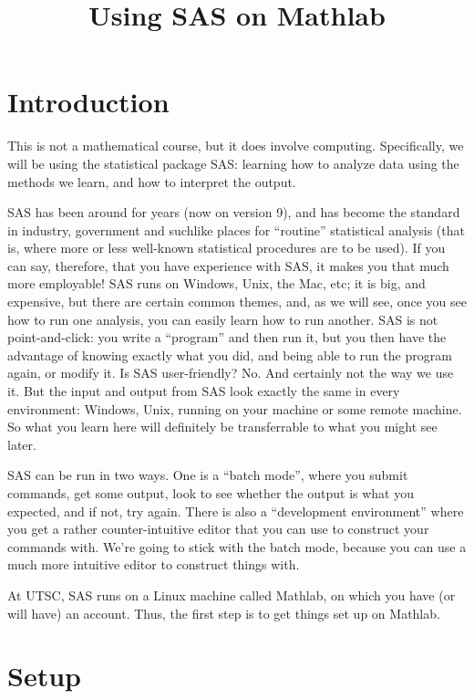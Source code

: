 \documentclass[11pt]{article}
\title{Using SAS on Mathlab}
\author{}
\date{}
\begin{document}
\maketitle

\section{Introduction}
\label{sec:intro}

This is not a mathematical course, but it does involve
computing. Specifically, we will be using the statistical package SAS:
learning how to analyze data using the methods we learn, and how to
interpret the output.

SAS has been around for years (now on version 9), and has become the
standard in industry, government and suchlike places for ``routine''
statistical analysis (that is, where more or less well-known
statistical procedures are to be used). If you can say, therefore,
that you have experience with SAS, it makes you that much more
employable! SAS runs on Windows, Unix, the Mac, etc; it is big, and
expensive, but there are certain common themes, and, as we will see,
once you see how to run one analysis, you can easily learn how to run
another. SAS is not point-and-click: you write a ``program'' and then
run it, but you then have the advantage of knowing exactly what you
did, and being able to run the program again, or modify it. Is SAS
user-friendly? No. And certainly not the way we use it.
But the input and output from SAS look exactly the same in
every environment: Windows, Unix, running on your machine or some
remote machine. So what you learn here will definitely be transferrable to
what you might see later.

SAS can be run in two ways. One is a ``batch mode'', where you submit
commands, get some output, look to see whether the output is what you
expected, and if not, try again. There is also a ``development
environment'' where you get a rather counter-intuitive editor that you
can use to construct your commands with.  We're going to stick with
the batch mode, because you can use a much more intuitive editor to
construct things with.

At UTSC, SAS runs on a Linux machine called Mathlab, on which you have
(or will have) an account. Thus, the first step is to get things set
up on Mathlab.

\section{Setup}
\end{document}
